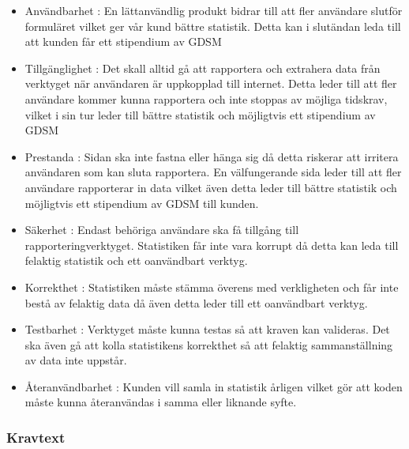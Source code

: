 \documentclass{article}
\begin{document}
\begin{itemize}

    \item Användbarhet : En lättanvändlig produkt bidrar till att fler användare slutför formuläret vilket ger vår kund bättre statistik. Detta kan i slutändan leda till att kunden får ett stipendium av GDSM
    
     \item Tillgänglighet : Det skall alltid gå att rapportera och extrahera data från verktyget när användaren är uppkopplad till internet. Detta leder till att fler användare kommer kunna rapportera och inte stoppas av möjliga tidskrav, vilket i sin tur leder till bättre statistik och möjligtvis ett stipendium av GDSM
 
     
   \item Prestanda : Sidan ska inte fastna eller hänga sig då detta riskerar att irritera användaren som kan sluta rapportera. En välfungerande sida leder till att fler användare rapporterar in data vilket även detta leder till bättre statistik och möjligtvis ett stipendium av GDSM till kunden.

     \item Säkerhet : Endast behöriga användare ska få tillgång till rapporteringverktyget. Statistiken får inte vara korrupt då detta kan leda till felaktig statistik och ett oanvändbart verktyg.
     
     \item Korrekthet : Statistiken måste stämma överens med verkligheten och får inte bestå av felaktig data då även detta leder till ett oanvändbart verktyg.
     \\
     
     \item Testbarhet : Verktyget måste kunna testas så att kraven kan valideras. Det ska även gå att kolla statistikens korrekthet så att felaktig sammanställning av data inte uppstår.
     
     \item Återanvändbarhet : Kunden vill samla in statistik årligen vilket gör att koden måste kunna återanvändas i samma eller liknande syfte.
     
\end{itemize}

\subsubsection{Kravtext}
\end{document}
